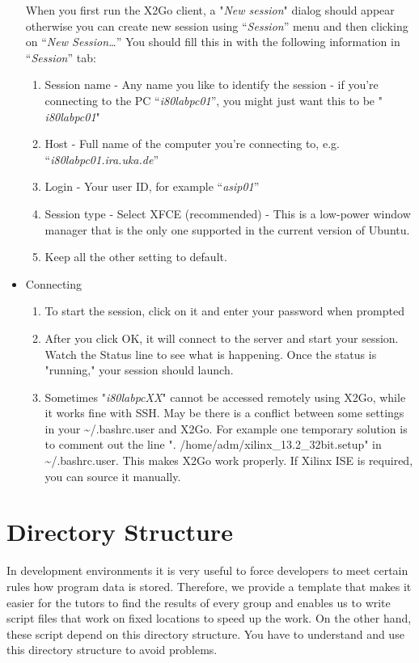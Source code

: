 \begin{itemize}
When you first run the X2Go client, a "\emph{New session}" dialog should
appear otherwise you can create new session using ``\emph{Session}''
menu and then clicking on ``\emph{New Session\ldots{}}'' You should fill
this in with the following information in ``\emph{Session}'' tab:
\begin{enumerate}
\def\labelenumi{\alph{enumi}.}
\item
  Session name - Any name you like to identify the session - if you're
  connecting to the PC ``\emph{i80labpc01}'', you might just want this
  to be " \emph{i80labpc01}"
\item
  Host - Full name of the computer you're connecting to, e.g.
  ``\emph{i80labpc01.ira.uka.de}''
\item
  Login - Your user ID, for example ``\emph{asip01}''
\item
  Session type - Select XFCE (recommended) - This is a low-power window
  manager that is the only one supported in the current version of
  Ubuntu.
\item
  Keep all the other setting to default.
\end{enumerate}
\item
  Connecting
  \begin{enumerate}
  \def\labelenumi{\alph{enumi}.}
  \item
    To start the session, click on it and enter your password when
    prompted
  \item
    After you click OK, it will connect to the server and start your
    session. Watch the Status line to see what is happening. Once the
    status is "running," your session should launch.
  \item
    Sometimes "\emph{i80labpcXX}" cannot be accessed remotely using
    X2Go, while it works fine with SSH. May be there is a conflict
    between some settings in your \textasciitilde/.bashrc.user and X2Go.
    For example one temporary solution is to comment out the line ".
    /home/adm/xilinx\_13.2\_32bit.setup" in
    \textasciitilde/.bashrc.user. This makes X2Go work properly. If
    Xilinx ISE is required, you can source it manually.
  \end{enumerate}
\end{itemize}
\hypertarget{directory-structure}{%
\section{Directory Structure}\label{directory-structure}}
In development environments it is very useful to force developers to
meet certain rules how program data is stored. Therefore, we provide a
template that makes it easier for the tutors to find the results of
every group and enables us to write script files that work on fixed
locations to speed up the work. On the other hand, these script depend
on this directory structure. You have to understand and use this
directory structure to avoid problems.


